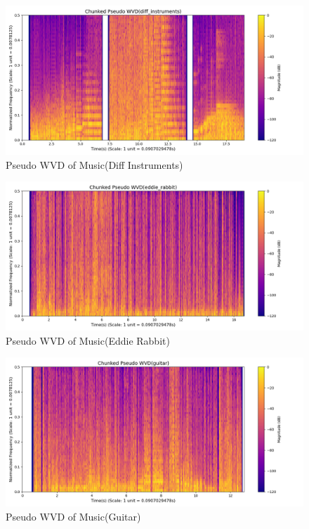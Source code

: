 \documentclass[12pt,a4paper,onecolumn]{exam}
\begin{document}
\begin{solution}
        \begin{figure}[H]
        \centering
        \includegraphics[scale = 0.45]{music_diff_instruments_pwvd.png}
        \caption{Pseudo WVD of Music(Diff Instruments)}
        \label{fig:41}
        \end{figure}    

        \begin{figure}[H]
        \centering
        \includegraphics[scale = 0.45]{music_eddie_rabbit_pwvd.png}
        \caption{Pseudo WVD of Music(Eddie Rabbit)}
        \label{fig:42}
        \end{figure}    

        \begin{figure}[H]
        \centering
        \includegraphics[scale = 0.45]{music_guitar_pwvd.png}
        \caption{Pseudo WVD of Music(Guitar)}
        \label{fig:43}
        \end{figure}    


\end{solution}
\end{document}
